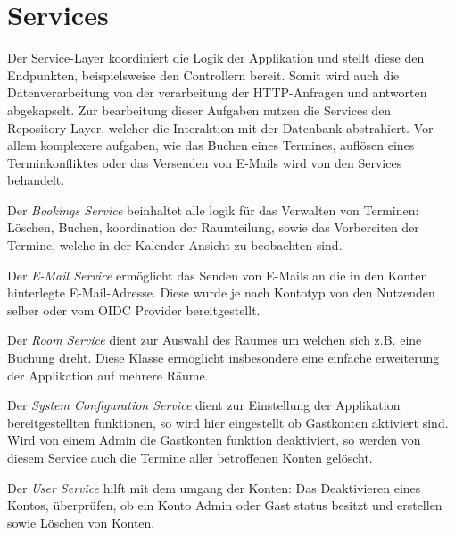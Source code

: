 
\chapter{Services}
\label{ch:services}

Der Service-Layer koordiniert die Logik der Applikation und stellt diese den Endpunkten, beispielsweise den Controllern bereit.
Somit wird auch die Datenverarbeitung von der verarbeitung der HTTP-Anfragen und antworten abgekapselt.
Zur bearbeitung dieser Aufgaben nutzen die Services den Repository-Layer, welcher die Interaktion mit der Datenbank abstrahiert.
Vor allem komplexere aufgaben, wie das Buchen eines Termines, auflösen eines Terminkonfliktes oder das
Versenden von E-Mails wird von den Services behandelt.

Der \textit{Bookings Service} beinhaltet alle logik für das Verwalten von Terminen: Löschen, Buchen, koordination der Raumteilung, sowie das Vorbereiten der Termine, welche in der Kalender Ansicht zu beobachten sind.

Der \textit{E-Mail Service} ermöglicht das Senden von E-Mails an die in den Konten hinterlegte E-Mail-Adresse.
Diese wurde je nach Kontotyp von den Nutzenden selber oder vom \gls{OIDC} Provider bereitgestellt.

Der \textit{Room Service} dient zur Auswahl des Raumes um welchen sich z.B. eine Buchung dreht.
Diese Klasse ermöglicht insbesondere eine einfache erweiterung der Applikation auf mehrere Räume.

Der \textit{System Configuration Service} dient zur Einstellung der Applikation bereitgestellten funktionen, so wird hier eingestellt ob Gastkonten aktiviert sind.
Wird von einem Admin die Gastkonten funktion deaktiviert, so werden von diesem Service auch die Termine aller betroffenen Konten gelöscht.

Der \textit{User Service} hilft mit dem umgang der Konten: Das Deaktivieren eines Kontos, überprüfen, ob ein Konto Admin oder Gast status besitzt und erstellen sowie Löschen von Konten.


